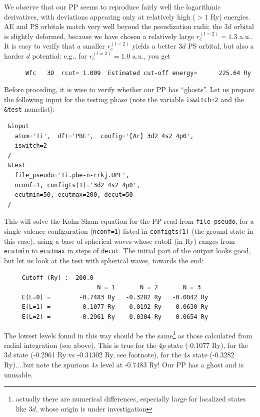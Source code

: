\documentclass[12pt,a4paper]{article}
\begin{document}
We observe that our PP seems to reproduce fairly well
the logarithmic derivatives, with deviations appearing only at 
relatively high ($> 1$ Ry) energies. AE and PS orbitals match
very well beyond the pseudization radii; the $3d$ orbital is 
slightly deformed, because we have chosen a relatively large 
$r_c^{(l=2)}=1.3$ a.u.. It is easy to verify that a smaller
$r_c^{(l=2)}$ yields a better $3d$ PS orbital, but also a harder
$d$ potential: e.g., for $r_c^{(l=2)}=1.0$ a.u., you get
\begin{verbatim}
      Wfc   3D  rcut= 1.009  Estimated cut-off energy=      225.64 Ry
\end{verbatim}
Before proceding, it is wise to verify whether our PP has ``ghosts''.
Let us prepare the following input for the testing phase 
(note the variable \texttt{iswitch=2} and the \texttt{\&test}
namelist):
\begin{verbatim}
 &input
   atom='Ti',  dft='PBE',  config='[Ar] 3d2 4s2 4p0',
   iswitch=2
 /
 &test
   file_pseudo='Ti.pbe-n-rrkj.UPF',
   nconf=1, configts(1)='3d2 4s2 4p0',
   ecutmin=50, ecutmax=200, decut=50
 /
\end{verbatim}
This will solve the Kohn-Sham equation for the PP read from  
\texttt{file\_pseudo}, for a single valence configuration
(\texttt{nconf=1}) listed in \texttt{configts(1)} (the ground state
in this case), using a base of spherical waves whose cutoff
(in Ry) ranges from \texttt{ecutmin} to \texttt{ecutmax} in steps of
\texttt{decut}. The initial part of the output looks good, but let us
look at the test with spherical waves, towards the end:
\begin{verbatim}
     Cutoff (Ry) :  200.0
                          N = 1       N = 2       N = 3
     E(L=0) =        -0.7483 Ry   -0.3282 Ry   -0.0042 Ry
     E(L=1) =        -0.1077 Ry    0.0192 Ry    0.0630 Ry
     E(L=2) =        -0.2961 Ry    0.0304 Ry    0.0654 Ry
\end{verbatim}
The lowest levels found in this way should be the same\footnote{actually 
there are numerical differences, especially large for localized states 
like $3d$, whose origin is under investigation} 
as those calculated from radial integration (see above). 
This is true for the $4p$ state (-0.1077 Ry), 
for the $3d$ state (-0.2961 Ry vs -0.31302 Ry, see footnote),
for the $4s$ state (-0.3282 Ry)....but note the spurious $4s$ 
level at -0.7483 Ry! Our PP has a ghost and is unusable. 
\end{document}
